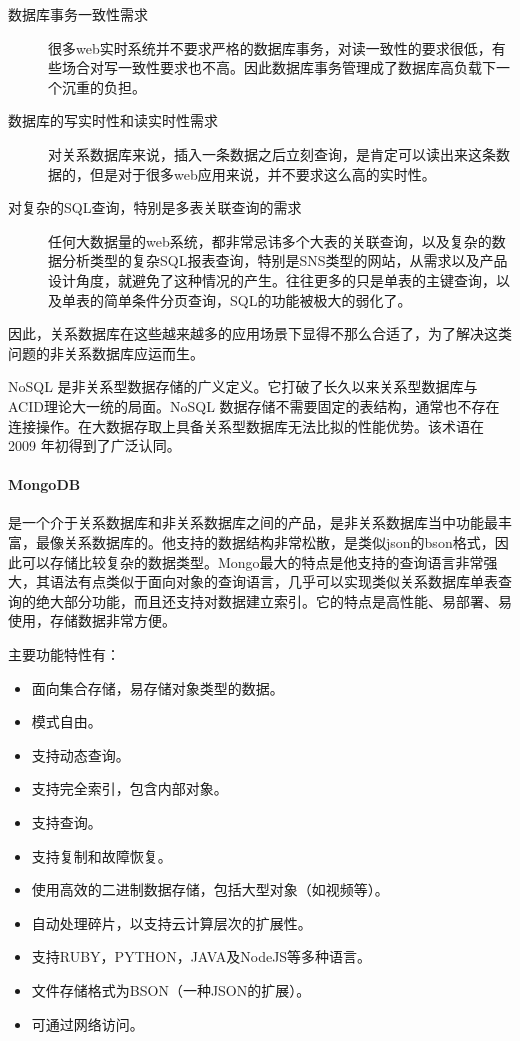 \begin{description}
    \item[数据库事务一致性需求] 很多web实时系统并不要求严格的数据库事务，对读一致性的要求很低，有些场合对写一致性要求也不高。因此数据库事务管理成了数据库高负载下一个沉重的负担。
    \item[数据库的写实时性和读实时性需求] 对关系数据库来说，插入一条数据之后立刻查询，是肯定可以读出来这条数据的，但是对于很多web应用来说，并不要求这么高的实时性。
    \item[对复杂的SQL查询，特别是多表关联查询的需求] 任何大数据量的web系统，都非常忌讳多个大表的关联查询，以及复杂的数据分析类型的复杂SQL报表查询，特别是SNS类型的网站，从需求以及产品设计角度，就避免了这种情况的产生。往往更多的只是单表的主键查询，以及单表的简单条件分页查询，SQL的功能被极大的弱化了。
\end{description}

\noindent
因此，关系数据库在这些越来越多的应用场景下显得不那么合适了，为了解决这类问题的非关系数据库应运而生。

NoSQL 是非关系型数据存储的广义定义。它打破了长久以来关系型数据库与ACID理论大一统的局面。NoSQL 数据存储不需要固定的表结构，通常也不存在连接操作。在大数据存取上具备关系型数据库无法比拟的性能优势。该术语在 2009 年初得到了广泛认同。

\paragraph{MongoDB}
是一个介于关系数据库和非关系数据库之间的产品，是非关系数据库当中功能最丰富，最像关系数据库的。他支持的数据结构非常松散，是类似json的bson格式，因此可以存储比较复杂的数据类型。Mongo最大的特点是他支持的查询语言非常强大，其语法有点类似于面向对象的查询语言，几乎可以实现类似关系数据库单表查询的绝大部分功能，而且还支持对数据建立索引。它的特点是高性能、易部署、易使用，存储数据非常方便。

\noindent
主要功能特性有：
\begin{itemize}
  \item 面向集合存储，易存储对象类型的数据。
  \item 模式自由。
  \item 支持动态查询。
  \item 支持完全索引，包含内部对象。
  \item 支持查询。
  \item 支持复制和故障恢复。
  \item 使用高效的二进制数据存储，包括大型对象（如视频等）。
  \item 自动处理碎片，以支持云计算层次的扩展性。
  \item 支持RUBY，PYTHON，JAVA及NodeJS等多种语言。
  \item 文件存储格式为BSON（一种JSON的扩展）。
  \item 可通过网络访问。
\end{itemize}

